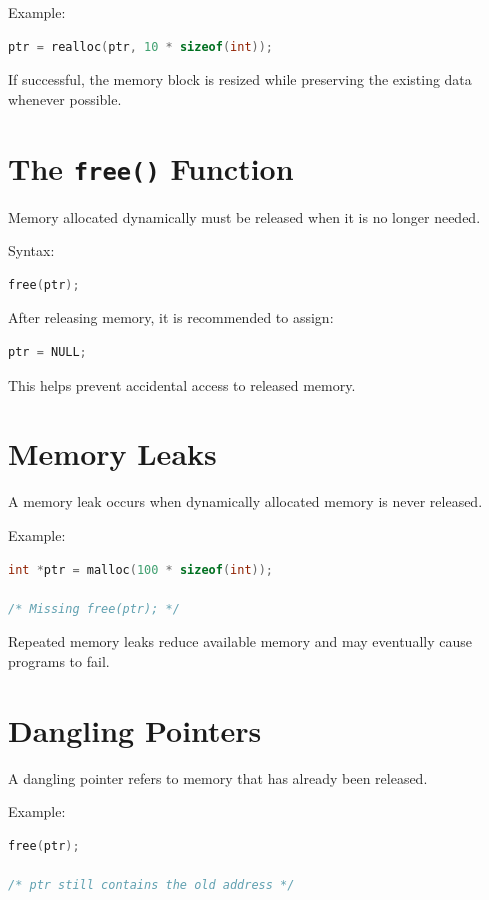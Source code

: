 \documentclass[12pt,openany]{book}
\begin{document}
Example:

\begin{lstlisting}[language=C]
ptr = realloc(ptr, 10 * sizeof(int));
\end{lstlisting}

If successful, the memory block is resized while preserving the existing data whenever possible.

\section{The \texttt{free()} Function}

Memory allocated dynamically must be released when it is no longer needed.

Syntax:

\begin{lstlisting}[language=C]
free(ptr);
\end{lstlisting}

After releasing memory, it is recommended to assign:

\begin{lstlisting}[language=C]
ptr = NULL;
\end{lstlisting}

This helps prevent accidental access to released memory.

\section{Memory Leaks}

A memory leak occurs when dynamically allocated memory is never released.

Example:

\begin{lstlisting}[language=C]
int *ptr = malloc(100 * sizeof(int));

/* Missing free(ptr); */
\end{lstlisting}

Repeated memory leaks reduce available memory and may eventually cause programs to fail.

\section{Dangling Pointers}

A dangling pointer refers to memory that has already been released.

Example:

\begin{lstlisting}[language=C]
free(ptr);

/* ptr still contains the old address */
\end{lstlisting}
\end{document}

